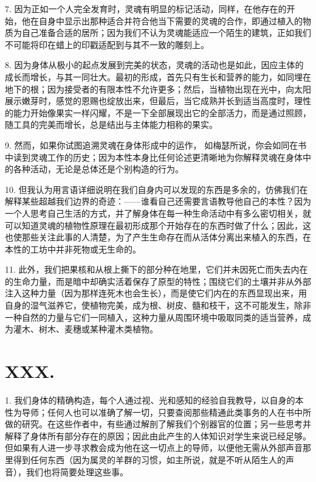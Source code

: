 7. 因为正如一个人完全发育时，灵魂有明显的标记活动，同样，在他存在的开始，他在自身中显示出那种适合并符合他当下需要的灵魂的合作，即通过植入的物质为自己准备合适的居所；因为我们不认为灵魂能适应一个陌生的建筑，正如我们不可能将印在蜡上的印戳适配到与其不一致的雕刻上。\par

8. 因为身体从极小的起点发展到完美的状态，灵魂的活动也是如此，因应主体的成长而增长，与其一同壮大。最初的形成，首先只有生长和营养的能力，如同埋在地下的根；因为接受者的有限本性不允许更多；然后，当植物出现在光中，向太阳展示嫩芽时，感觉的恩赐也绽放出来，但最后，当它成熟并长到适当高度时，理性的能力开始像果实一样闪耀，不是一下全部展现出它的全部活力，而是通过照顾，随工具的完美而增长，总是结出与主体能力相称的果实。\par

9. 然而，如果你试图追溯灵魂在身体形成中的运作， 如梅瑟所说，你会如同在书中读到灵魂工作的历史；因为本性本身比任何论述更清晰地为你解释灵魂在身体中的各种活动，无论是总体还是个别构造的行为。\par

10. 但我认为用言语详细说明在我们自身内可以发现的东西是多余的，仿佛我们在解释某些超越我们边界的奇迹：——谁看自己还需要言语教导他自己的本性？因为一个人思考自己生活的方式，并了解身体在每一种生命活动中有多么密切相关，就可以知道灵魂的植物性原理在最初形成那个开始存在的东西时做了什么；因此，这也使那些关注此事的人清楚，为了产生生命存在而从活体分离出来植入的东西，在本性的工坊中并非死物或无生命的。\par

11. 此外，我们把果核和从根上撕下的部分种在地里，它们并未因死亡而失去内在的生命力量，而是暗中却确实活着保存了原型的特性；围绕它们的土壤并非从外部注入这种力量（因为那样连死木也会生长），而是使它们内在的东西显现出来，用自身的湿气滋养它，使植物完美，成为根、树皮、髓和枝干，这不可能发生，除非一种自然的力量与它们一同植入，这种力量从周围环境中吸取同类的适当营养，成为灌木、树木、麦穗或某种灌木类植物。\par


\section{XXX. }

1. 我们身体的精确构造，每个人通过视、光和感知的经验自我教导，以自身的本性为导师；任何人也可以准确了解一切，只要查阅那些精通此类事务的人在书中所做的研究。在这些作者中，有些通过解剖了解我们个别器官的位置；另一些思考并解释了身体所有部分存在的原因；因此由此产生的人体知识对学生来说已经足够。但如果有人进一步寻求教会成为他在这一切点上的导师，以便他无需从外部声音那里得到任何东西（因为属灵的羊群的习惯，如主所说，就是不听从陌生人的声音），我们也将简要处理这些事。\par

